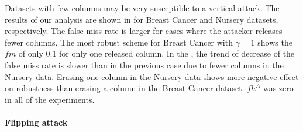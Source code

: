 \documentclass[runningheads]{llncs}
\begin{document}
Datasets with few columns may be very susceptible to a vertical attack. 
The results of our analysis are shown in  for Breast Cancer and Nursery datasets, respectively. 
The false miss rate is larger for cases where the attacker releases fewer columns. 
The most robust scheme for Breast Cancer with $\gamma=1$ shows the $fm$ of only 0.1 for only one released column.
In the , the trend of decrease of the false miss rate is slower than in the previous case due to fewer columns in the Nursery data. Erasing one column in the Nursery data shows more negative effect on robustness than erasing a column in the Breast Cancer dataset.  
%
$fh^A$ was zero in all of the experiments.

\paragraph{Flipping attack}
% 
\end{document}
